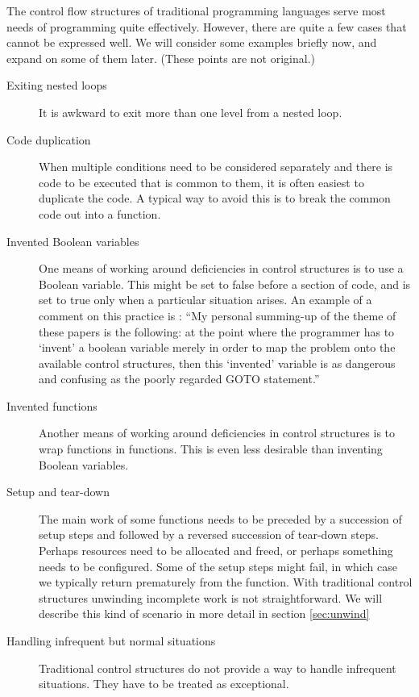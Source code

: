 \documentclass[10pt]{amsart}
\begin{document}
The control flow structures of traditional programming languages serve
most needs of programming quite effectively.  However, there are quite
a few cases that cannot be expressed well.  We will consider some
examples briefly now, and expand on some of them later.  (These points
are not original.)
\begin{description}
\item[Exiting nested loops] It is awkward to exit more than one level
  from a nested loop.
\item[Code duplication]  When multiple conditions need to be
  considered separately and there is code to be executed that is
  common to them, it is often easiest to duplicate the code.  A
  typical way to avoid this is to break the common code out into a
  function.
\item[Invented Boolean variables] One means of working around
  deficiencies in control structures is to use a Boolean variable.
  This might be set to false before a section of code, and is set to
  true only when a particular situation arises.  An example of a
  comment on this practice is \cite[section 2.2, \emph{Deeply Nested
    IF-THEN-ELSE Considered Harmful}]{WilliamsDO84}: ``My personal
  summing-up of the theme of these papers is the following: at the
  point where the programmer has to `invent' a boolean variable merely
  in order to map the problem onto the available control structures,
  then this `invented' variable is as dangerous and confusing as the
  poorly regarded GOTO statement.''
\item[Invented functions] Another means of working around deficiencies
  in control structures is to wrap functions in functions.  This is
  even less desirable than inventing Boolean variables.
\item[Setup and tear-down] The main work of some functions needs to be
  preceded by a succession of setup steps and followed by a reversed
  succession of tear-down steps.  Perhaps resources need to be
  allocated and freed, or perhaps something needs to be configured.
  Some of the setup steps might fail, in which case we typically
  return prematurely from the function.  With traditional control
  structures unwinding incomplete work is not straightforward.  We
  will describe this kind of scenario in more detail in section
  \ref{sec:unwind}
\item[Handling infrequent but normal situations] Traditional control
  structures do not provide a way to handle infrequent situations.
  They have to be treated as exceptional.
\end{description}
\end{document}
